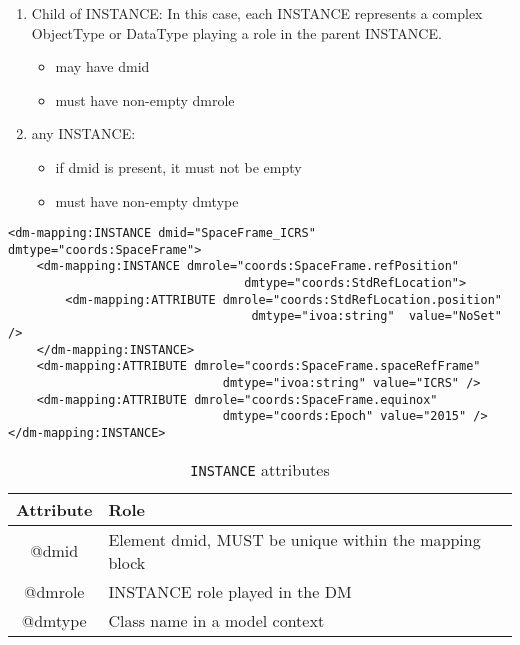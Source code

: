 \begin{enumerate}
\item Child of INSTANCE: 
     In this case, each INSTANCE represents 
     a complex ObjectType or DataType playing a role in the parent INSTANCE.     
     \begin{itemize}
        \item may have dmid
        \item must have non-empty dmrole
     \end{itemize}
           
\item any INSTANCE:     
   \begin{itemize}
        \item if dmid is present, it must not be empty
        \item must have non-empty dmtype
    \end{itemize}
\end{enumerate}  
    
   
\begin{lstlisting}[frame=single,caption={Example of INSTANCE child of GLOBALS},style=XML,basicstyle=\tiny]
<dm-mapping:INSTANCE dmid="SpaceFrame_ICRS" dmtype="coords:SpaceFrame">
	<dm-mapping:INSTANCE dmrole="coords:SpaceFrame.refPosition"
                                 dmtype="coords:StdRefLocation">
		<dm-mapping:ATTRIBUTE dmrole="coords:StdRefLocation.position" 
		                          dmtype="ivoa:string"  value="NoSet" />
	</dm-mapping:INSTANCE>
	<dm-mapping:ATTRIBUTE dmrole="coords:SpaceFrame.spaceRefFrame" 
	                          dmtype="ivoa:string" value="ICRS" />
	<dm-mapping:ATTRIBUTE dmrole="coords:SpaceFrame.equinox" 
	                          dmtype="coords:Epoch"	value="2015" />
</dm-mapping:INSTANCE>
\end{lstlisting}   
   

\begin{table}[!htbp]
\small
\centering
\begin{tabulary}{\linewidth}{|c|J|}       
       \hline 
            \textbf{Attribute} & 
            \textbf {Role}\\
       \hline         \hline  
            @dmid & 
            Element dmid, MUST be unique within the mapping block  \\
        \hline 
            @dmrole & 
            INSTANCE role played in the DM \\
        \hline 
            @dmtype & 
            Class name in a model context\\
        \hline 
     \end{tabulary}
     \caption{\texttt{INSTANCE} attributes} 
     \label{tbl:instance-att}
 \end{table}   
 


